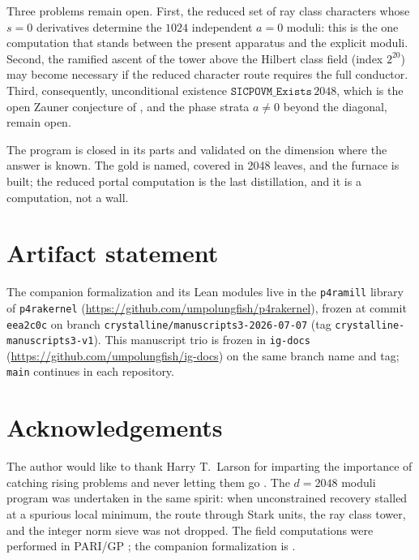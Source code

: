 \documentclass[12pt,a4paper]{article}
\begin{document}
Three problems remain open.  First, the reduced set of ray class characters
whose $s=0$ derivatives determine the $1024$ independent $a=0$ moduli: this is
the one computation that stands between the present apparatus and the explicit
moduli.  Second, the ramified ascent of the tower above the Hilbert class field
(index $2^{20}$) may become necessary if the reduced character route requires
the full conductor.  Third, consequently, unconditional existence
$\texttt{SICPOVM\_Exists}\,2048$, which is the open Zauner conjecture of
\cite{StarkHilbert12}, and the phase strata $a\neq 0$ beyond the diagonal,
remain open.

The program is closed in its parts and validated on the dimension where the
answer is known.  The gold is named, covered in 2048 leaves, and the furnace is
built; the reduced portal computation is the last distillation, and it is a
computation, not a wall.

\section*{Artifact statement}
The companion formalization \cite{StarkHilbert12} and its Lean modules live in
the \texttt{p4ramill} library of \texttt{p4rakernel}
(\url{https://github.com/umpolungfish/p4rakernel}), frozen at commit
\texttt{eea2c0c} on branch \texttt{crystalline/manuscripts3-2026-07-07} (tag
\texttt{crystalline-manuscripts3-v1}).  This manuscript trio is frozen in
\texttt{ig-docs} (\url{https://github.com/umpolungfish/ig-docs}) on the same
branch name and tag; \texttt{main} continues in each repository.

\section*{Acknowledgements}
The author would like to thank Harry T.\ Larson for imparting the importance
of catching rising problems and never letting them go \cite{Larson1961}.
The $d=2048$ moduli program was undertaken in the same spirit: when
unconstrained recovery stalled at a spurious local minimum, the route through
Stark units, the ray class tower, and the integer norm sieve was not dropped.
The field computations were performed in PARI/GP \cite{PARI}; the companion
formalization is \cite{StarkHilbert12}.
\end{document}
